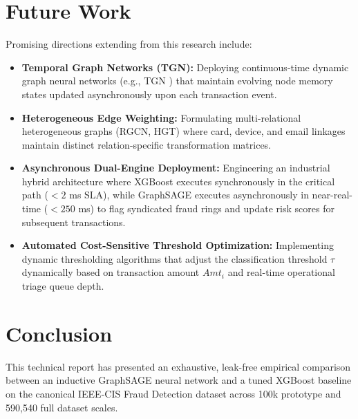 \documentclass[11pt,a4paper]{report}
\begin{document}
\section{Future Work}
Promising directions extending from this research include:
\begin{itemize}
    \item \textbf{Temporal Graph Networks (TGN):} Deploying continuous-time dynamic graph neural networks (e.g., TGN \cite{rossi2020temporal}) that maintain evolving node memory states updated asynchronously upon each transaction event.
    \item \textbf{Heterogeneous Edge Weighting:} Formulating multi-relational heterogeneous graphs (RGCN, HGT) where card, device, and email linkages maintain distinct relation-specific transformation matrices.
    \item \textbf{Asynchronous Dual-Engine Deployment:} Engineering an industrial hybrid architecture where XGBoost executes synchronously in the critical path ($< 2$ ms SLA), while GraphSAGE executes asynchronously in near-real-time ($< 250$ ms) to flag syndicated fraud rings and update risk scores for subsequent transactions.
    \item \textbf{Automated Cost-Sensitive Threshold Optimization:} Implementing dynamic thresholding algorithms that adjust the classification threshold $\tau$ dynamically based on transaction amount $Amt_i$ and real-time operational triage queue depth.
\end{itemize}

\section{Conclusion}
This technical report has presented an exhaustive, leak-free empirical comparison between an inductive GraphSAGE neural network and a tuned XGBoost baseline on the canonical IEEE-CIS Fraud Detection dataset across 100k prototype and 590,540 full dataset scales.
\end{document}
